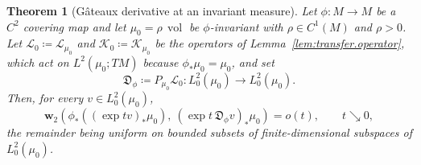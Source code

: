 \documentclass[11pt,reqno]{amsart}
\theoremstyle{plain}
\newtheorem{thm}{Theorem}[section]
\theoremstyle{definition}
\newcommand{\dw}{\mathbf{w}_2}
\newcommand{\D}{\mathfrak{D}}
\newcommand{\lto}{\longrightarrow}
\newcommand{\Koop}{\mathcal{K}}
\newcommand{\Transf}{\mathcal{L}}
\DeclareMathOperator{\vol}{vol}
\begin{document}
\begin{thm}[G\^ateaux derivative at an invariant measure]
\label{thm:derivative.acim}
    Let \( \phi:M\to M \) be a \( C^2 \) covering map and let \( \mu_0=\rho\,\vol \) be \( \phi \)-invariant with \( \rho\in C^1(M) \) and \( \rho>0 \).
    Let \( \Transf_0\coloneqq\Transf_{\mu_0} \) and \( \Koop_0\coloneqq\Koop_{\mu_0} \) be the operators of Lemma~\ref{lem:transfer.operator}, which act on \( L^2(\mu_0;TM) \) because \( \phi_\ast\mu_0=\mu_0 \), and set
    \[
        \D_\phi\coloneqq P_{\mu_0}\Transf_0:L^2_0(\mu_0)\lto L^2_0(\mu_0) .
    \]
    Then, for every \( v\in L^2_0(\mu_0) \),
    \[
        \dw\left(\phi_\ast\left((\exp tv)_\ast\mu_0\right),\ \left(\exp t\,\D_\phi v\right)_\ast\mu_0\right)=o(t),\qquad t\searrow0 ,
    \]
    the remainder being uniform on bounded subsets of finite-dimensional subspaces of \( L^2_0(\mu_0) \).
\end{thm}
\end{document}
